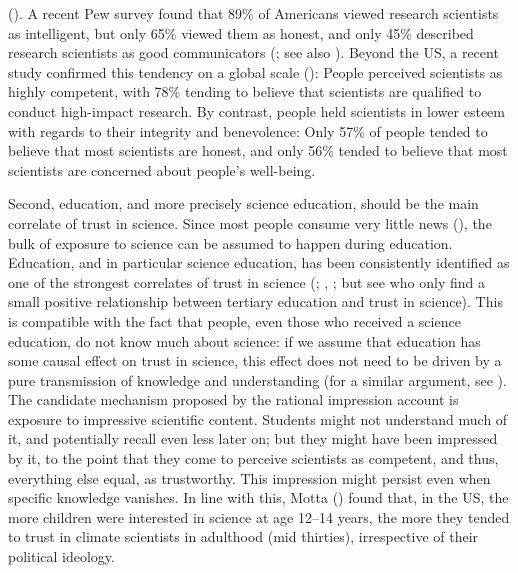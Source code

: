 \documentclass[
  jou,
  floatsintext,
  longtable,
  nolmodern,
  notxfonts,
  notimes,
  colorlinks=true,linkcolor=blue,citecolor=blue,urlcolor=blue]{apa7}
\begin{document}
(). A
recent Pew survey found that 89\% of Americans viewed research
scientists as intelligent, but only 65\% viewed them as honest, and only
45\% described research scientists as good communicators
(; see also ). Beyond the US, a recent study confirmed this tendency on
a global scale (): People perceived scientists as highly competent, with
78\% tending to believe that scientists are qualified to conduct
high-impact research. By contrast, people held scientists in lower
esteem with regards to their integrity and benevolence: Only 57\% of
people tended to believe that most scientists are honest, and only 56\%
tended to believe that most scientists are concerned about people's
well-being.

Second, education, and more precisely science education, should be the
main correlate of trust in science. Since most people consume very
little news (), the bulk of exposure to science can be assumed to happen during
education. Education, and in particular science education, has been
consistently identified as one of the strongest correlates of trust in
science (;
,
; but
see 
who only find a small positive relationship between tertiary education
and trust in science). This is compatible with the fact that people,
even those who received a science education, do not know much about
science: if we assume that education has some causal effect on trust in
science, this effect does not need to be driven by a pure transmission
of knowledge and understanding (for a similar argument, see
). The
candidate mechanism proposed by the rational impression account is
exposure to impressive scientific content. Students might not understand
much of it, and potentially recall even less later on; but they might
have been impressed by it, to the point that they come to perceive
scientists as competent, and thus, everything else equal, as
trustworthy. This impression might persist even when specific knowledge
vanishes. In line with this, Motta
() found that, in
the US, the more children were interested in science at age 12--14
years, the more they tended to trust in climate scientists in adulthood
(mid thirties), irrespective of their political ideology.
\end{document}
